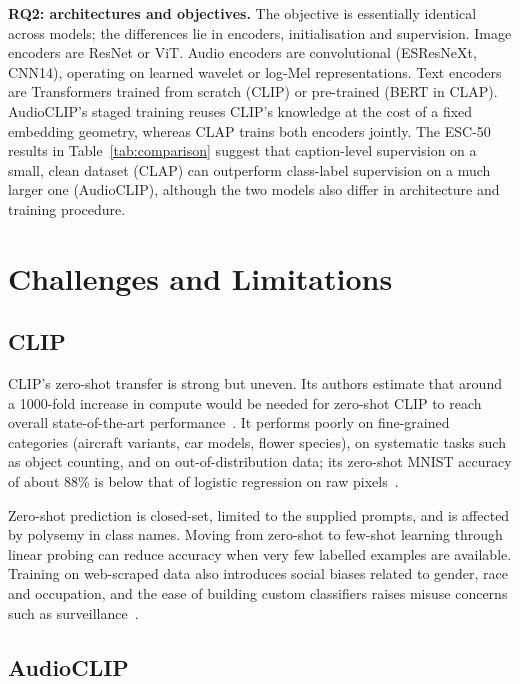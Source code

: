 \documentclass[pdflatex,sn-mathphys-num]{sn-jnl}%
\theoremstyle{thmstyleone}%
\theoremstyle{thmstyletwo}%
\theoremstyle{thmstylethree}%
\begin{document}
\textbf{RQ2: architectures and objectives.} The objective is essentially identical across models; the differences lie in encoders, initialisation and supervision. Image encoders are ResNet or ViT. Audio encoders are convolutional (ESResNeXt, CNN14), operating on learned wavelet or log-Mel representations. Text encoders are Transformers trained from scratch (CLIP) or pre-trained (BERT in CLAP). AudioCLIP's staged training reuses CLIP's knowledge at the cost of a fixed embedding geometry, whereas CLAP trains both encoders jointly. The ESC-50 results in Table~\ref{tab:comparison} suggest that caption-level supervision on a small, clean dataset (CLAP) can outperform class-label supervision on a much larger one (AudioCLIP), although the two models also differ in architecture and training procedure.

\section{Challenges and Limitations}\label{sec6}

\subsection{CLIP}

CLIP's zero-shot transfer is strong but uneven. Its authors estimate that around a 1000-fold increase in compute would be needed for zero-shot CLIP to reach overall state-of-the-art performance~\cite{radford2021clip}. It performs poorly on fine-grained categories (aircraft variants, car models, flower species), on systematic tasks such as object counting, and on out-of-distribution data; its zero-shot MNIST accuracy of about 88\% is below that of logistic regression on raw pixels~\cite{radford2021clip}.

Zero-shot prediction is closed-set, limited to the supplied prompts, and is affected by polysemy in class names. Moving from zero-shot to few-shot learning through linear probing can reduce accuracy when very few labelled examples are available. Training on web-scraped data also introduces social biases related to gender, race and occupation, and the ease of building custom classifiers raises misuse concerns such as surveillance~\cite{radford2021clip}.

\subsection{AudioCLIP}
\end{document}

